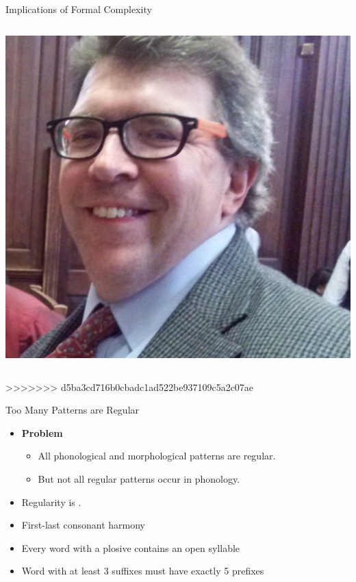 \documentclass[xcolor={usenames,svgnames,x11names,table}]{beamer}
\begin{document}
\begin{frame}{Implications of Formal Complexity}
\begin{columns}
        \bigskip
        \includegraphics[width=1\linewidth]{./img/idsardi}\\
    \end{columns}
>>>>>>> d5ba3cd716b0cbadc1ad522be937109c5a2c07ae
\end{frame}

\begin{frame}{Too Many Patterns are Regular}
    \begin{itemize}
        \item \textbf{Problem}
            \begin{itemize}
                \item All phonological and morphological patterns are regular.
                \item But not all regular patterns occur in phonology.
            \end{itemize}
        \item Regularity is .
    \end{itemize}
    \pause
    \begin{example}
        \begin{itemize}
            \item First-last consonant harmony
            \item Every word with a plosive contains an open syllable
            \item Word with at least 3 suffixes must have exactly 5 prefixes
        \end{itemize}
    \end{example}
\end{frame}
\end{document}
